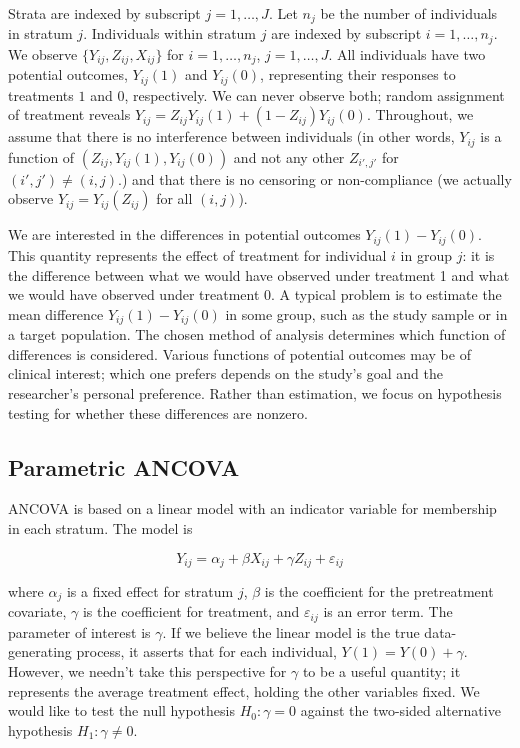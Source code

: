 \documentclass[12pt]{article}
\begin{document}
Strata are indexed by subscript $j = 1, \dots, J$.
Let $n_j$ be the number of individuals in stratum $j$.
Individuals within stratum $j$ are indexed by subscript $i = 1, \dots, n_j$.
We observe $\{Y_{ij}, Z_{ij}, X_{ij}\}$ for $i = 1, \dots, n_j$, $j = 1, \dots, J$.
All individuals have two potential outcomes, $Y_{ij}(1)$ and $Y_{ij}(0)$, representing their responses to treatments $1$ and $0$, respectively.
We can never observe both; random assignment of treatment reveals $Y_{ij} = Z_{ij}Y_{ij}(1) + (1-Z_{ij})Y_{ij}(0)$.
Throughout, we assume that there is no interference between individuals 
(in other words, $Y_{ij}$ is a function of $(Z_{ij}, Y_{ij}(1), Y_{ij}(0))$ and not any other $Z_{i', j'}$ for $(i', j') \neq (i, j)$.)
and that there is no censoring or non-compliance
(we actually observe $Y_{ij} = Y_{ij}(Z_{ij})$ for all $(i, j)$).

We are interested in the differences in potential outcomes $Y_{ij}(1) - Y_{ij}(0)$.
This quantity represents the effect of treatment for individual $i$ in group $j$: 
it is the difference between what we would have observed under treatment 1 and what we would have observed under treatment $0$.
A typical problem is to estimate the mean difference $Y_{ij}(1) - Y_{ij}(0)$ in some group, such as the study sample or in a target population.
The chosen method of analysis determines which function of differences is considered.
Various functions of potential outcomes may be of clinical interest; which one prefers depends on the study's goal and the researcher's personal preference.
Rather than estimation, we focus on hypothesis testing for whether these differences are nonzero.

\subsection{Parametric ANCOVA}\label{subsec:ancova}

ANCOVA is based on a linear model with an indicator variable for membership in each stratum.
The model is

\begin{equation}\label{eqn:ancova}
Y_{ij} = \alpha_j + \beta X_{ij} + \gamma Z_{ij} + \varepsilon_{ij}
\end{equation}

\noindent where $\alpha_j$ is a fixed effect for stratum $j$, $\beta$ is the coefficient for the pretreatment covariate,
$\gamma$ is the coefficient for treatment,
and $\varepsilon_{ij}$ is an error term.
The parameter of interest is $\gamma$. 
If we believe the linear model is the true data-generating process, it asserts that for each individual, $Y(1) = Y(0) + \gamma$.
However, we needn't take this perspective for $\gamma$ to be a useful quantity; it represents the average treatment effect, holding the other variables fixed.
We would like to test the null hypothesis $H_0: \gamma = 0$ against
the two-sided alternative hypothesis $H_1: \gamma \neq 0$.
\end{document}
